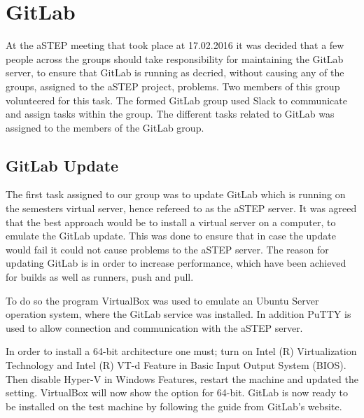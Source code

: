 \section{GitLab}
At the aSTEP meeting that took place at 17.02.2016 it was decided that a few people across the groups should take responsibility for maintaining the GitLab server, to ensure that GitLab is running as decried, without causing any of the groups, assigned to the aSTEP project, problems. Two members of this group volunteered for this task. 
The formed GitLab group used Slack to communicate and assign tasks within the group. The different tasks related to GitLab was assigned to the members of the GitLab group.

\subsection{GitLab Update}
The first task assigned to our group was to update GitLab which is running on the semesters virtual server, hence refereed to as the aSTEP server. It was agreed that the best approach would be to install a virtual server on a computer, to emulate the GitLab update. This was done to ensure that in case the update would fail it could not cause problems to the aSTEP server.
The reason for updating GitLab is in order to increase performance, which have been achieved for builds as well as runners, push and pull. 

To do so the program VirtualBox\cite{vbox} was used to emulate an Ubuntu Server operation system, where the GitLab service was installed. In addition PuTTY\cite{putty} is used to allow connection and communication with the aSTEP server.

In order to install a 64-bit architecture one must; turn on Intel (R) Virtualization Technology and Intel (R) VT-d Feature in Basic Input Output System (BIOS). Then disable Hyper-V in Windows Features, restart the machine and updated the setting. VirtualBox will now show the option for 64-bit. 
GitLab is now ready to be installed on the test machine by following the guide from GitLab's website\cite{gitlab_guide}.


